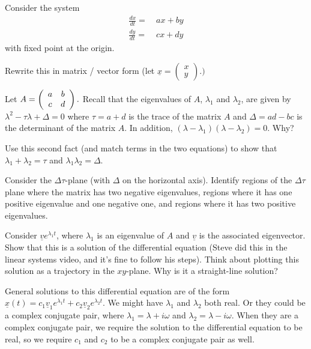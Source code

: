 \documentclass[12pt,letterpaper,noanswers]{exam}
\begin{document}
\begin{questions}
Consider the system 
\begin{align*}
\frac{dx}{dt} =&\ ax + by \\
\frac{dy}{dt} =&\ cx + dy
\end{align*}
with fixed point at the origin.
\begin{parts}
\item Rewrite this in matrix / vector form (let $\displaystyle \underline{x} = \left(\begin{array}{c} x \\ y \end{array}\right).)$
\item Let $\displaystyle A = \left(\begin{array}{c c} a & b \\ c & d \end{array}\right).$  Recall that the eigenvalues of $A$, $\lambda_1$ and $\lambda_2$, are given by $\lambda^2 - \tau \lambda + \Delta = 0$ where $\tau = a +d $ is the trace of the matrix $A$ and $\Delta = ad - bc$ is the determinant of the matrix $A$.  In addition, $(\lambda - \lambda_1)(\lambda-\lambda_2) = 0$.  Why?
\item Use this second fact (and match terms in the two equations) to show that $\lambda_1 + \lambda_2 = \tau$ and $\lambda_1\lambda_2 = \Delta$.
\item Consider the $\Delta\tau$-plane (with $\Delta$ on the horizontal axis).  Identify regions of the $\Delta\tau$ plane where the matrix has two negative eigenvalues, regions where it has one positive eigenvalue and one negative one, and regions where it has two positive eigenvalues.
\item Consider $\underline{v}e^{\lambda_1 t}$, where $\lambda_1$ is an eigenvalue of $A$ and $\underline{v}$ is the associated eigenvector.  Show that this is a solution of the differential equation (Steve did this in the linear systems video, and it's fine to follow his steps).  Think about plotting this solution as a trajectory in the $xy$-plane.  Why is it a straight-line solution?
\item General solutions to this differential equation are of the form $\displaystyle\underline{x}(t) = c_1\underline{v}_1e^{\lambda_1 t} + c_2\underline{v}_2e^{\lambda_2 t}$.  We might have $\lambda_1$ and $\lambda_2$ both real.  Or they could be a complex conjugate pair, where $\lambda_1 = \lambda+i\omega$ and $\lambda_2 = \lambda-i\omega$.  When they are a complex conjugate pair, we require the solution to the differential equation to be real, so we require $c_1$ and $c_2$ to be a complex conjugate pair as well.


\end{parts}
\end{questions}
\end{document}
